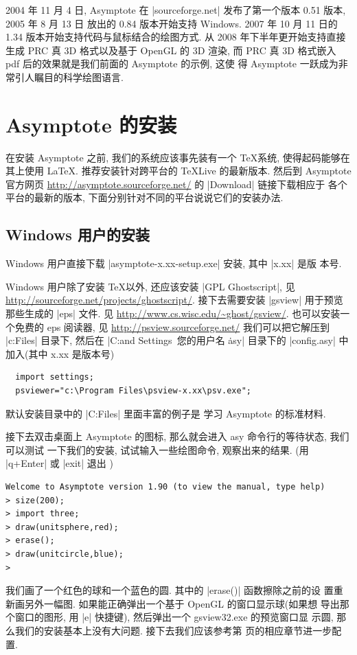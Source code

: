 \documentclass{ctexbook}
\begin{document}
2004 年 11 月 4 日, Asymptote 在 |sourceforge.net| 发布了第一个版本
0.51 版本, 2005 年 8 月 13 日 放出的 0.84 版本开始支持 Windows. 2007
年 10 月 11 日的 1.34 版本开始支持代码与鼠标结合的绘图方式. 从 2008
年下半年更开始支持直接生成 PRC 真 3D 格式以及基于 OpenGL 的 3D 渲染,
而 PRC 真 3D 格式嵌入 pdf 后的效果就是我们前面的 Asymptote 的示例, 这使
得 Asymptote 一跃成为非常引人瞩目的科学绘图语言.

\section{Asymptote 的安装}
在安装 Asymptote 之前, 我们的系统应该事先装有一个 \TeX 系统,
使得起码能够在其上使用 \LaTeX. 推荐安装针对跨平台的 TeXLive
的最新版本. 然后到 Asymptote官方网页
\url{http://asymptote.sourceforge.net/} 的 |Download| 链接下载相应于
各个平台的最新的版本, 下面分别针对不同的平台说说它们的安装办法.

\subsection{Windows 用户的安装}
Windows 用户直接下载 |asymptote-x.xx-setup.exe| 安装, 其中 |x.xx| 是版
本号.

Windows 用户除了安装 \TeX 以外, 还应该安装 |GPL Ghostscript|, 见
\url{http://sourceforge.net/projects/ghostscript/}. 接下去需要安装
|gsview| 用于预览那些生成的 |eps| 文件.
见 \url{http://www.cs.wisc.edu/~ghost/gsview/}.
也可以安装一个免费的 eps 阅读器, 见
\url{http://psview.sourceforge.net/} 我们可以把它解压到
|c:\Program Files| 目录下, 然后在
|C:\Documents and Settings\ 您的用户名 \.asy|
目录下的 |config.asy| 中加入(其中 x.xx 是版本号)
\begin{lstlisting}
  import settings;
  psviewer="c:\Program Files\psview-x.xx\psv.exe";
\end{lstlisting}

默认安装目录中的 |C:\Program Files\Asymptote\examples| 里面丰富的例子是
学习 Asymptote 的标准材料.

接下去双击桌面上 Asymptote 的图标, 那么就会进入 asy 命令行的等待状态, 我们可以测试
一下我们的安装, 试试输入一些绘图命令, 观察出来的结果. (用 |q+Enter| 或 |exit|  退出 )
\begin{verbatim}
Welcome to Asymptote version 1.90 (to view the manual, type help)
> size(200);
> import three;
> draw(unitsphere,red);
> erase();
> draw(unitcircle,blue);
>
\end{verbatim}
我们画了一个红色的球和一个蓝色的圆. 其中的 |erase()| 函数擦除之前的设
置重新画另外一幅图. 如果能正确弹出一个基于 OpenGL 的窗口显示球(如果想
导出那个窗口的图形, 用 |e| 快捷键), 然后弹出一个 gsview32.exe 的预览窗口显
示圆, 那么我们的安装基本上没有大问题. 接下去我们应该参考第
\pageref{asy:Settings} 页的相应章节进一步配置.
\end{document}
